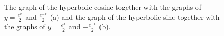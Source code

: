 \begin{figure}[H]
			\centering
\centerline{
\hspace{0.5cm}
}
	\caption{The graph of the hyperbolic cosine together with the graphs of $y=\frac{e^{x}}{2}$ and $\frac{e^{-x}}{2}$ (a) and the graph of the hyperbolic sine together with the graphs of $y=\frac{e^{x}}{2}$ and $-\frac{e^{-x}}{2}$ (b).}
		\label{fig_trans_39}
\end{figure}

